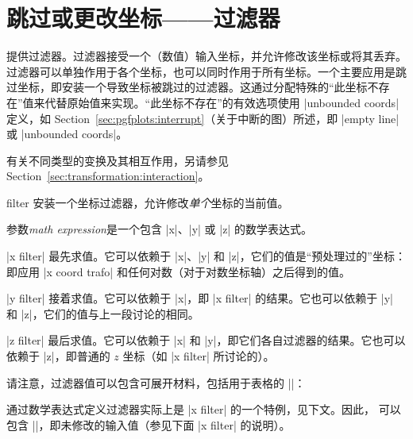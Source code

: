 
\section{跳过或更改坐标——过滤器}
\label{sec:filters}

\PGFPlots{} 提供过滤器。过滤器接受一个（数值）输入坐标，并允许修改该坐标或将其丢弃。过滤器可以单独作用于各个坐标，也可以同时作用于所有坐标。一个主要应用是跳过坐标，即安装一个导致坐标被跳过的过滤器。这通过分配特殊的“此坐标不存在”值来代替原始值来实现。“此坐标不存在”的有效选项使用 |unbounded coords| 定义，如 Section~\ref{sec:pgfplots:interrupt}（关于中断的图）所述，即 |empty line| 或 |unbounded coords|。

有关不同类型的变换及其相互作用，另请参见 Section~\ref{sec:transformation:interaction}。

\begin{pgfplotsxyexpressionkeylist}{\x\space filter}
    安装一个坐标过滤器，允许修改\emph{单个}坐标的当前值。

    参数\emph{math expression}是一个包含 |x|、|y| 或 |z| 的数学表达式。
\begin{codeexample}[]
\end{codeexample}

    |x filter| 最先求值。它可以依赖于 |x|、|y| 和 |z|，它们的值是“预处理过的”坐标：即应用 |x coord trafo| 和任何对数（对于对数坐标轴）之后得到的值。

    |y filter| 接着求值。它可以依赖于 |x|，即 |x filter| 的结果。它也可以依赖于 |y| 和 |z|，它们的值与上一段讨论的相同。

    |z filter| 最后求值。它可以依赖于 |x| 和 |y|，即它们各自过滤器的结果。它也可以依赖于 |z|，即普通的 $z$ 坐标（如 |x filter| 所讨论的）。

    请注意，过滤器值可以包含可展开材料，包括用于表格的 |\thisrow|：
\begin{codeexample}[]
\end{codeexample}
    通过数学表达式定义过滤器实际上是 |x filter| 的一个特例，见下文。因此， 可以包含 |\pgfmathresult|，即未修改的输入值（参见下面 |x filter| 的说明）。
\end{pgfplotsxyexpressionkeylist}

